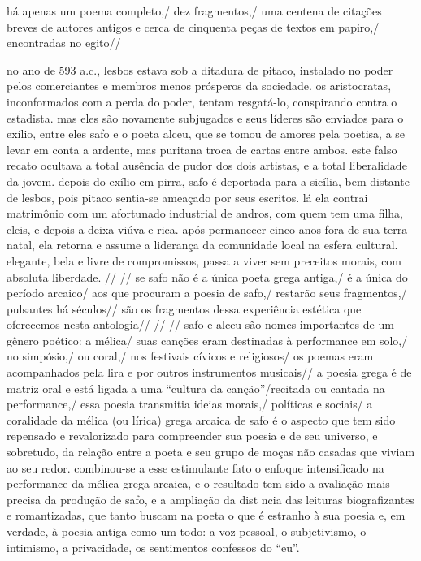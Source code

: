 \documentclass[12pt]{extarticle}
\begin{document}
há apenas um poema completo,/ dez fragmentos,/ uma centena de citações breves de autores antigos e cerca de cinquenta peças de textos em papiro,/ encontradas no egito//

no ano de 593 a.c., lesbos estava sob a ditadura de pitaco, instalado no poder pelos comerciantes e membros menos prósperos da sociedade. os aristocratas, inconformados com a perda do poder, tentam resgatá-lo, conspirando contra o estadista. mas eles são novamente subjugados e seus líderes são enviados para o exílio, entre eles safo e o poeta alceu, que se tomou de amores pela poetisa, a se levar em conta a ardente, mas puritana troca de cartas entre ambos. este falso recato ocultava a total ausência de pudor dos dois artistas, e a total liberalidade da jovem.
depois do exílio em pirra, safo é deportada para a sicília, bem distante de lesbos, pois pitaco sentia-se ameaçado por seus escritos. lá ela contrai matrimônio com um afortunado industrial de andros, com quem tem uma filha, cleis, e depois a deixa viúva e rica. após permanecer cinco anos fora de sua terra natal, ela retorna e assume a liderança da comunidade local na esfera cultural. elegante, bela e livre de compromissos, passa a viver sem preceitos morais, com absoluta liberdade.
 //
//
se safo não é a única poeta grega antiga,/ é a única do período arcaico/
aos que procuram a poesia de safo,/ restarão seus fragmentos,/ pulsantes há séculos// são os fragmentos dessa experiência estética que oferecemos nesta antologia//
 //
//
safo e alceu são nomes importantes de um gênero poético: a mélica/ suas canções eram destinadas à performance em solo,/  no simpósio,/ ou coral,/ nos festivais cívicos e religiosos/
os poemas eram acompanhados pela lira e por outros instrumentos musicais//
a poesia grega é de matriz oral e está ligada a uma “cultura da canção”/recitada ou cantada na performance,/ essa poesia transmitia ideias morais,/ políticas e sociais/
a coralidade da mélica (ou lírica) grega arcaica de safo é o aspecto que tem sido repensado e revalorizado para compreender sua poesia e de seu universo, e sobretudo, da relação entre a poeta e seu grupo de moças não casadas que viviam ao seu redor.
combinou-se a esse estimulante fato o enfoque intensificado na performance da mélica grega arcaica, e o resultado tem sido a avaliação mais precisa da produção de safo, e a ampliação da dist ncia das leituras biografizantes e romantizadas, que tanto buscam na poeta o que é estranho à sua poesia e, em verdade, à poesia antiga como um todo: a voz pessoal, o subjetivismo, o intimismo, a privacidade, os sentimentos confessos do “eu”. 
\end{document}
